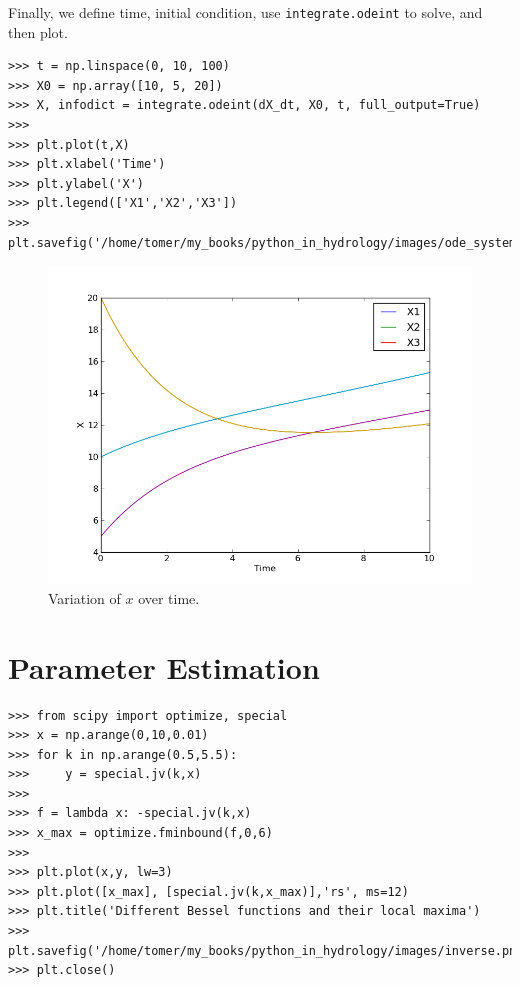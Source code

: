 \documentclass[10pt]{book}
\begin{document}
{Finally, we define time, initial condition, use \verb"integrate.odeint" to solve, and then plot. 
\beforeverb \begin{verbatim}     
>>> t = np.linspace(0, 10, 100)    
>>> X0 = np.array([10, 5, 20]) 
>>> X, infodict = integrate.odeint(dX_dt, X0, t, full_output=True)
>>> 
>>> plt.plot(t,X)
>>> plt.xlabel('Time')
>>> plt.ylabel('X')
>>> plt.legend(['X1','X2','X3'])
>>> plt.savefig('/home/tomer/my_books/python_in_hydrology/images/ode_system.png')
\end{verbatim} \afterverb

\beforefig
\begin{figure}[h!]
  \centering
    \includegraphics[scale=0.5]{images/ode_system.png}
  \caption{Variation of $x$ over time.}
   \label{fig:ode}
\end{figure}
\afterfig

\section{Parameter Estimation}
\beforeverb \begin{verbatim}
>>> from scipy import optimize, special
>>> x = np.arange(0,10,0.01)
>>> for k in np.arange(0.5,5.5):
>>>     y = special.jv(k,x)
>>> 
>>> f = lambda x: -special.jv(k,x)
>>> x_max = optimize.fminbound(f,0,6)
>>> 
>>> plt.plot(x,y, lw=3)
>>> plt.plot([x_max], [special.jv(k,x_max)],'rs', ms=12)
>>> plt.title('Different Bessel functions and their local maxima')
>>> plt.savefig('/home/tomer/my_books/python_in_hydrology/images/inverse.png')
>>> plt.close()
\end{verbatim} \afterverb
{}

}
\end{document}
